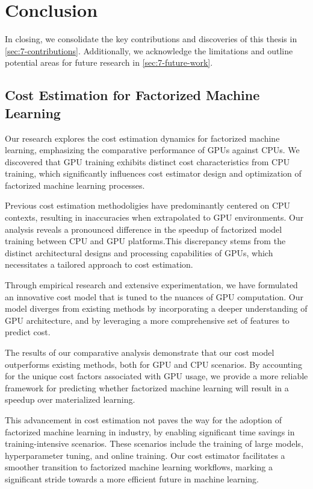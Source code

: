 
\chapter{Conclusion}

\label{chapter:conclusion}
In closing, we consolidate the key contributions and discoveries of this thesis in \autoref{sec:7-contributions}. Additionally, we acknowledge the limitations and outline potential areas for future research in \autoref{sec:7-future-work}.

\section{Cost Estimation for Factorized Machine Learning}
\label{sec:7-contributions}
Our research explores the cost estimation dynamics for factorized machine learning, emphasizing the comparative performance of GPUs against CPUs. We discovered that GPU training exhibits distinct cost characteristics from CPU training, which significantly influences cost estimator design and optimization of factorized machine learning processes.

Previous cost estimation methodoligies have predominantly centered on CPU contexts, resulting in inaccuracies when extrapolated to GPU environments. Our analysis reveals a pronounced difference in the speedup of factorized model training between CPU and GPU platforms.This discrepancy stems from the distinct architectural designs and processing capabilities of GPUs, which necessitates a tailored approach to cost estimation.

Through empirical research and extensive experimentation, we have formulated an innovative cost model that is tuned to the nuances of GPU computation. Our model diverges from existing methods by incorporating a deeper understanding of GPU architecture, and by leveraging a more comprehensive set of features to predict cost.

The results of our comparative analysis demonstrate that our cost model outperforms existing methods, both for GPU and CPU scenarios. By accounting for the unique cost factors associated with GPU usage, we provide a more reliable framework for predicting whether factorized machine learning will result in a speedup over materialized learning.

This advancement in cost estimation not paves the way for the adoption of factorized machine learning in industry, by enabling significant time savings in training-intensive scenarios. These scenarios include the training of large models, hyperparameter tuning, and online training. Our cost estimator facilitates a smoother transition to factorized machine learning workflows, marking a significant stride towards a more efficient future in machine learning.

